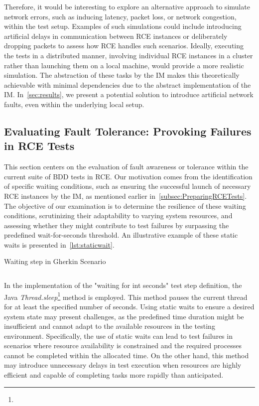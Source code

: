 Therefore, it would be interesting to explore an alternative approach to simulate network errors, such as inducing latency, packet loss, or network congestion, within the test setup. Examples of such simulations could include introducing artificial delays in communication between \ac{RCE} instances or deliberately dropping packets to assess how \ac{RCE} handles such scenarios. Ideally, executing the tests in a distributed manner, involving individual \ac{RCE} instances in a cluster rather than launching them on a local machine, would provide a more realistic simulation. The abstraction of these tasks by the \ac{IM} makes this theoretically achievable with minimal dependencies due to the abstract implementation of the \ac{IM}. In~\cref{sec:results}, we present a potential solution to introduce artificial network faults, even within the underlying local setup.

\subsection{Evaluating Fault Tolerance: Provoking Failures in \ac{RCE} Tests}
\label{subsec:staticwaits}
This section centers on the evaluation of fault awareness or tolerance within the current suite of \ac{BDD} tests in \ac{RCE}. Our motivation comes from the identification of specific waiting conditions, such as ensuring the successful launch of necessary RCE instances by the \ac{IM}, as mentioned earlier in~\cref{subsec:PreparingRCETests}. The objective of our examination is to determine the resilience of these waiting conditions, scrutinizing their adaptability to varying system resources, and assessing whether they might contribute to test failures by surpassing the predefined wait-for-seconds threshold. An illustrative example of these static waits is presented in~\cref{lst:staticwait}.

\begin{listing}[!ht]
\caption{Waiting step in Gherkin Scenario}
\label{lst:staticwait}
\inputminted{gherkin}{files/code/staticwait.feature}
\end{listing}

In the implementation of the "waiting for {int} seconds" test step definition, the Java \textit{Thread.sleep}\footnote{} method is employed. This method pauses the current thread for at least the specified number of seconds. Using static waits to ensure a desired system state may present challenges, as the predefined time duration might be insufficient and cannot adapt to the available resources in the testing environment. Specifically, the use of static waits can lead to test failures in scenarios where resource availability is constrained and the required processes cannot be completed within the allocated time. On the other hand, this method may introduce unnecessary delays in test execution when resources are highly efficient and capable of completing tasks more rapidly than anticipated.

